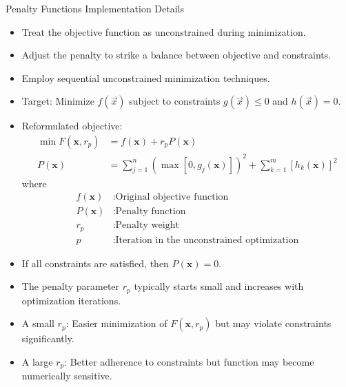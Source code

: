 \documentclass[
    NAME={Dr. Helga Ingimundardóttir},
    EMAIL={helgaingim@hi.is},
    FACULTY={Industrial Engineering},
    TITLE={Nonlinear Optimization},
    SUBTITLE={Approaches and Challenges},
    SEMINAR={VÉL113F},
    DATE={Design and Optimization}
]{../HI-latex/hi-beamer}
\begin{document}
\begin{frame}{Penalty Functions}
        \alert{Implementation Details}
        \begin{itemize}
            \item Treat the objective function as unconstrained during minimization.
            \item Adjust the penalty to strike a balance between objective and constraints.
            \item Employ sequential unconstrained minimization techniques.
        \end{itemize}
        \framebreak
        \begin{itemize}
            \item \alert{Target}: Minimize \( f(\vec{x}) \) subject to constraints \( g(\vec{x})\leq 0 \) and \( h(\vec{
                x})=0 \).
            \item \alert{Reformulated objective}:
            \begin{align*}
                \min F(\mathbf{x}, r_p) &= f(\mathbf{x}) + r_p P(\mathbf{x}) \\
                P(\mathbf{x}) &= \sum_{j=1}^{n} \left( \max[0, g_j(\mathbf{x})] \right)^2 + \sum_{k=1}^{m} [h_k(\mathbf{x})]^2
            \end{align*}
            where
            \begin{align*}
                f(\mathbf{x}) & : \text{Original objective function} \\
                P(\mathbf{x}) & : \text{Penalty function} \\
                r_p & : \text{Penalty weight} \\
                p & : \text{Iteration in the unconstrained optimization}
            \end{align*}
        \end{itemize}
        \framebreak
        \begin{itemize}
            \item If all constraints are satisfied, then \( P(\mathbf{x}) = 0 \).
            \item The penalty parameter \( r_p \) typically starts small and increases with optimization iterations.
            \item A small \( r_p \): Easier minimization of \( F(\mathbf{x}, r_p) \) but may violate constraints significantly.
            \item A large \( r_p \): Better adherence to constraints but function may become numerically sensitive.
        \end{itemize}


\end{frame}
\end{document}
